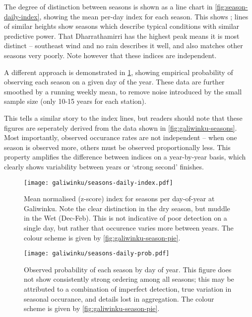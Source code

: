 The degree of distinction between seasons is shown as a line chart in
\cref{fig:season-daily-index}, showing the mean per-day index for each
season.  This shows ; lines of similar heights show seasons which describe
typical conditions with similar predictive power.  That Dharrathamirri
has the highest peak means it is most distinct -- southeast wind and no
rain describes it well, and also matches other seasons very poorly.
Note however that these indices are independent.

A different approach is demonstrated in \cref{fig:season-daily-prob}, showing
empirical probability of observing each season on a given day of the year.
These data are further smoothed by a running weekly mean, to remove noise
introduced by the small sample size (only 10-15 years for each station).

This tells a similar story to the index lines, but readers should note
that these figures are seperately derived from the data shown in
\cref{fig:galiwinku-seasons}.  Most importantly, observed occurance
rates are not independent -- when one season is observed more, others
must be observed proportionally less.  This property amplifies the
difference between indices on a year-by-year basis, which clearly
shows variability between years or `strong second' finishes.


\begin{figure}[p]
    \centering
    \texttt{[image: galiwinku/seasons-daily-index.pdf]}
    \caption[Season index by day-of-year, Elcho Island]{
        Mean normalised (z-score) index for seasons per day-of-year
        at Galiwinku.  Note the clear distinction in the dry season,
        but muddle in the Wet (Dec-Feb).
        This is not indicative of poor detection on a single day,
        but rather that occurence varies more between years.
        The colour scheme is given by \cref{fig:galiwinku-season-pie}.
        }
    \label{fig:season-daily-index}
\vspace{1cm}
    \texttt{[image: galiwinku/seasons-daily-prob.pdf]}
    \caption[Season probability by day-of-year, Elcho Island]{
        Observed probability of each season by day of year.
        This figure does not show consistently strong ordering among all
        seasons; this may be attributed to a combination of imperfect
        detection, true variation in seasonal occurance, and details
        lost in aggregation.
        The colour scheme is given by \cref{fig:galiwinku-season-pie}.
        }
    \label{fig:season-daily-prob}
\end{figure}


